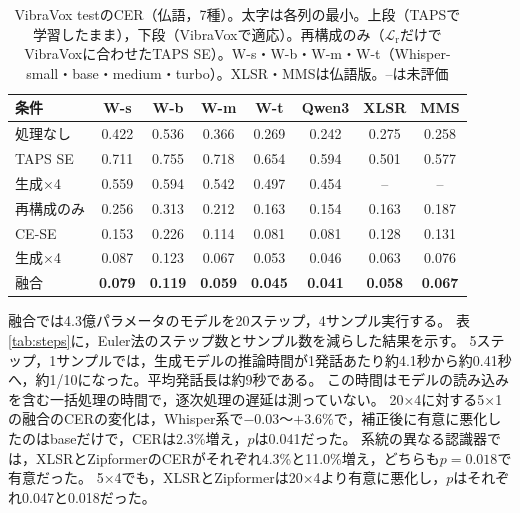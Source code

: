 \documentclass[xelatex,ja=standard,a4paper,twocolumn,10pt]{bxjsarticle}
\makeatletter
\renewcommand{\subsection}{\@startsection{subsection}{2}{\z@}{.7ex plus .2ex}{.3ex}{\normalfont\normalsize\sffamily\bfseries}}
\makeatother
\begin{document}
\begin{table}[t]
  \centering
  \caption{VibraVox testのCER（仏語，7種）。太字は各列の最小。上段（TAPSで学習したまま），下段（VibraVoxで適応）。再構成のみ（$\mathcal{L}_\mathrm{r}$だけでVibraVoxに合わせたTAPS SE）。W-s・W-b・W-m・W-t（Whisper-small・base・medium・turbo）。XLSR・MMSは仏語版。--は未評価}
  \label{tab:vbx}
  \footnotesize
  \setlength{\tabcolsep}{1.6pt}
  \begin{tabular}{lccccccc}
    \toprule
    条件 & W-s & W-b & W-m & W-t & Qwen3 & XLSR & MMS \\
    \midrule
    処理なし & 0.422 & 0.536 & 0.366 & 0.269 & 0.242 & 0.275 & 0.258 \\
    TAPS SE & 0.711 & 0.755 & 0.718 & 0.654 & 0.594 & 0.501 & 0.577 \\
    生成×4 & 0.559 & 0.594 & 0.542 & 0.497 & 0.454 & -- & -- \\
    \midrule
    再構成のみ & 0.256 & 0.313 & 0.212 & 0.163 & 0.154 & 0.163 & 0.187 \\
    CE-SE & 0.153 & 0.226 & 0.114 & 0.081 & 0.081 & 0.128 & 0.131 \\
    生成×4 & 0.087 & 0.123 & 0.067 & 0.053 & 0.046 & 0.063 & 0.076 \\
    融合 & \textbf{0.079} & \textbf{0.119} & \textbf{0.059} & \textbf{0.045} & \textbf{0.041} & \textbf{0.058} & \textbf{0.067} \\
    \bottomrule
  \end{tabular}
\end{table}

\subsection{計算量}
融合では4.3億パラメータのモデルを20ステップ，4サンプル実行する。
表\ref{tab:steps}に，Euler法のステップ数とサンプル数を減らした結果を示す。
5ステップ，1サンプルでは，生成モデルの推論時間が1発話あたり約4.1秒から約0.41秒へ，約1/10になった。平均発話長は約9秒である。
この時間はモデルの読み込みを含む一括処理の時間で，逐次処理の遅延は測っていない。
20×4に対する5×1の融合のCERの変化は，Whisper系で$-0.03$〜$+3.6$\%で，補正後に有意に悪化したのはbaseだけで，CERは2.3\%増え，$p$は0.041だった。
系統の異なる認識器では，XLSRとZipformerのCERがそれぞれ4.3\%と11.0\%増え，どちらも$p=0.018$で有意だった。
5×4でも，XLSRとZipformerは20×4より有意に悪化し，$p$はそれぞれ0.047と0.018だった。
\end{document}
